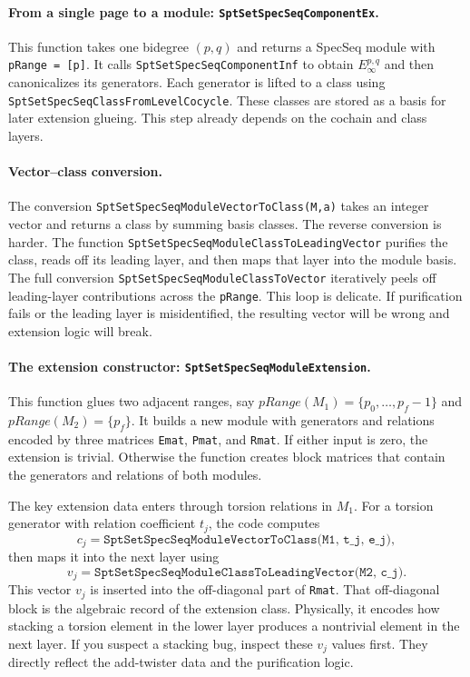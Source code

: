 \documentclass{SciPost}
\begin{document}
\paragraph{From a single page to a module: \texttt{SptSetSpecSeqComponentEx}.}
This function takes one bidegree $(p,q)$ and returns a SpecSeq module with \texttt{pRange = [p]}.
It calls \texttt{SptSetSpecSeqComponentInf} to obtain $E_\infty^{p,q}$ and then canonicalizes its generators.
Each generator is lifted to a class using \texttt{SptSetSpecSeqClassFromLevelCocycle}.
These classes are stored as a basis for later extension glueing.
This step already depends on the cochain and class layers.

\paragraph{Vector--class conversion.}
The conversion \texttt{SptSetSpecSeqModuleVectorToClass(M,a)} takes an integer vector and returns a class by summing basis classes.
The reverse conversion is harder.
The function \texttt{SptSetSpecSeqModuleClassToLeadingVector} purifies the class, reads off its leading layer, and then maps that layer into the module basis.
The full conversion \texttt{SptSetSpecSeqModuleClassToVector} iteratively peels off leading-layer contributions across the \texttt{pRange}.
This loop is delicate.
If purification fails or the leading layer is misidentified, the resulting vector will be wrong and extension logic will break.

\paragraph{The extension constructor: \texttt{SptSetSpecSeqModuleExtension}.}
This function glues two adjacent ranges, say $pRange(M_1)=\{p_0,\dots,p_f-1\}$ and $pRange(M_2)=\{p_f\}$.
It builds a new module with generators and relations encoded by three matrices \texttt{Emat}, \texttt{Pmat}, and \texttt{Rmat}.
If either input is zero, the extension is trivial.
Otherwise the function creates block matrices that contain the generators and relations of both modules.

The key extension data enters through torsion relations in $M_1$.
For a torsion generator with relation coefficient $t_j$, the code computes
\begin{equation}
c_{j} = \texttt{SptSetSpecSeqModuleVectorToClass(M1, t_j, e_j)},
\end{equation}
then maps it into the next layer using
\begin{equation}
v_j = \texttt{SptSetSpecSeqModuleClassToLeadingVector(M2, c_j)}.
\end{equation}
This vector $v_j$ is inserted into the off-diagonal part of \texttt{Rmat}.
That off-diagonal block is the algebraic record of the extension class.
Physically, it encodes how stacking a torsion element in the lower layer produces a nontrivial element in the next layer.
If you suspect a stacking bug, inspect these $v_j$ values first.
They directly reflect the add-twister data and the purification logic.
\end{document}
